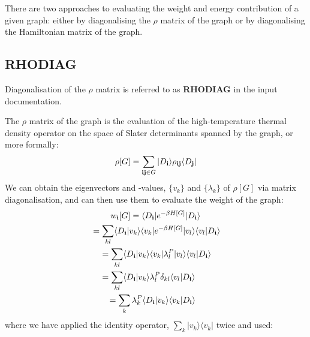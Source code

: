 \documentclass[openany,a4paper,10pt,english]{manual}
\newcommand{\bra}{\ensuremath{\langle}}
\newcommand{\ket}{\ensuremath{\rangle}}
\newcommand{\veci}{\ensuremath{\mathbf{i}}}
\newcommand{\vecj}{\ensuremath{\mathbf{j}}}
\begin{document}
There are two approaches to evaluating the weight and energy contribution
of a given graph: either by diagonalising the $\rho$  matrix of
the graph or by diagonalising the Hamiltonian matrix of the graph.


\subsection{\textbf{RHODIAG}}

Diagonalisation of the $\rho$  matrix is referred to as \textbf{RHODIAG}
in the input documentation.

The $\rho$  matrix of the graph is the evaluation of the
high-temperature thermal density operator on the space of Slater
determinants spanned by the graph, or more formally:
\begin{gather}
\begin{split}\rho[G] = \sum_{\veci\vecj \in G} |D_\veci \ket \rho_{\veci\vecj}\bra D_\vecj|\end{split}\notag
\end{gather}
We can obtain the eigenvectors and -values, $\{v_k\}$ and
$\{\lambda_k\}$ of $\rho[G]$ via matrix diagonalisation, and can
then use them to evaluate the weight of the graph:
\begin{gather}
\begin{split}w_{\veci}[G] & = \bra D_{\veci} | e^{-\beta H[G]} | D_{\veci} \ket \\\end{split}\notag\\\begin{split}             & = \sum_{kl} \bra D_{\veci} | v_k \ket \bra v_k |  e^{-\beta H[G]} | v_l \ket \bra v_l | D_{\veci} \ket \\\end{split}\notag\\\begin{split}             & = \sum_{kl} \bra D_{\veci} | v_k \ket \bra v_k | \lambda_l^P | v_l \ket \bra v_l | D_{\veci} \ket \\
             & = \sum_{kl} \bra D_{\veci} | v_k \ket \lambda_l^P \delta_{kl} \bra v_l | D_{\veci} \ket \\\end{split}\notag\\\begin{split}             & = \sum_k \lambda_k^P \bra D_{\veci} | v_k \ket \bra v_k | D_{\veci} \ket\end{split}\notag
\end{gather}
where we have applied the identity operator, $\sum_k |v_k \ket \bra v_k |$ twice and used:
\end{document}
